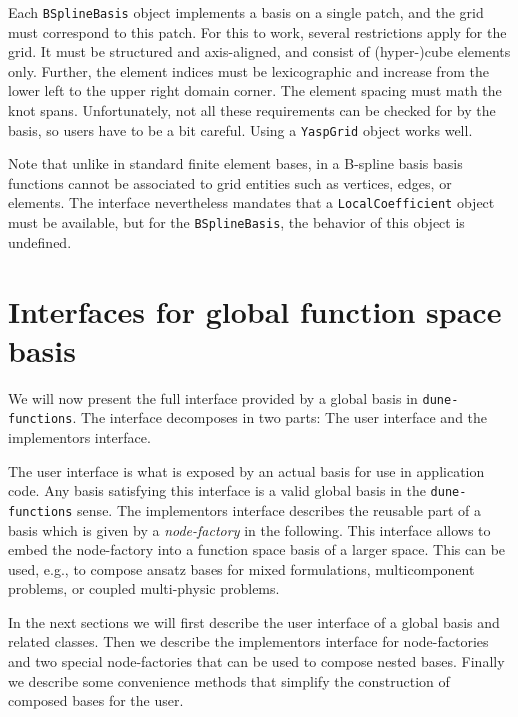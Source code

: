 \documentclass[a4paper,10pt,headings=normal,bibliography=totoc]{scrartcl}
\newcommand{\cpp}[1]{\lstinline[basicstyle=\ttfamily]!#1!}
\newcommand{\dunemodule}[1]{\texttt{#1}}
\begin{document}
\begin{itemize}
   Each \cpp{BSplineBasis} object implements a basis on a single patch, and the grid must correspond to this
   patch. For this to work, several restrictions apply for the grid.  It must be structured and axis-aligned,
   and consist of (hyper-)cube elements only.  Further, the element indices must be lexicographic and
   increase from the lower left to the upper right domain corner.  The element spacing must math the knot spans.
   Unfortunately, not all these requirements can be checked for by the basis, so users have to be a bit
   careful.  Using a \cpp{YaspGrid} object works well.

   Note that unlike in standard finite element bases, in a B-spline basis basis functions cannot be associated
   to grid entities such as vertices, edges, or elements.  The interface nevertheless mandates that a
   \cpp{LocalCoefficient} object must be available, but for the \cpp{BSplineBasis}, the behavior of this
   object is undefined.
\end{itemize}




\section{Interfaces for global function space basis}

We will now present the full interface provided by a global basis in
\dunemodule{dune-functions}. The interface decomposes in two parts:
The user interface and the implementors interface.

The user interface is what is exposed by an actual basis for use in
application code. Any basis satisfying this interface is a valid
global basis in the \dunemodule{dune-functions} sense.
The implementors interface describes the reusable part of
a basis which is given by a \emph{node-factory} in the following.
This interface allows to embed the node-factory into a function space
basis of a larger space. This can be used, e.g., to compose
ansatz bases for mixed formulations, multicomponent problems,
or coupled multi-physic problems.

In the next sections we will first describe the user interface
of a global basis and related classes. Then we describe the implementors
interface for node-factories and two special node-factories
that can be used to compose nested bases.
Finally we describe some convenience methods that simplify
the construction of composed bases for the user.
\end{document}
